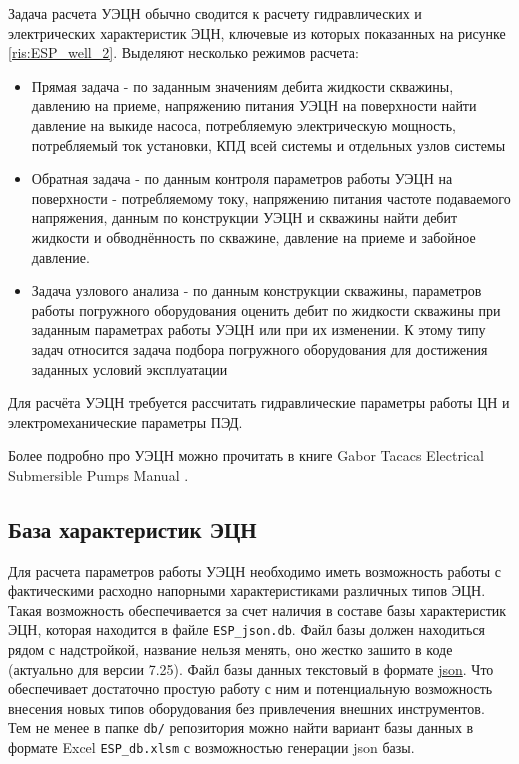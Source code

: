Задача расчета УЭЦН обычно сводится к расчету гидравлических и электрических характеристик ЭЦН, ключевые из которых показанных на рисунке \ref{ris:ESP_well_2}. Выделяют несколько режимов расчета:
\begin{itemize}
	\item Прямая задача - по заданным значениям дебита жидкости скважины,  давлению на приеме, напряжению питания УЭЦН на поверхности найти давление на выкиде насоса, потребляемую электрическую мощность, потребляемый ток установки, КПД всей системы и отдельных узлов системы
	\item Обратная задача - по данным контроля параметров работы УЭЦН на поверхности - потребляемому току, напряжению питания частоте подаваемого напряжения, данным по конструкции УЭЦН и скважины найти дебит жидкости и обводнённость по скважине, давление на приеме и забойное давление.
	\item Задача узлового анализа - по данным конструкции скважины, параметров работы погружного оборудования оценить дебит по жидкости скважины при заданным параметрах работы УЭЦН или при их изменении. К этому типу задач относится задача подбора погружного оборудования для достижения заданных условий эксплуатации 
	
\end{itemize}

Для расчёта УЭЦН требуется рассчитать гидравлические параметры работы ЦН и электромеханические параметры ПЭД.

Более подробно про УЭЦН можно прочитать в книге Gabor Tacacs Electrical Submersible Pumps Manual \cite{Gabor_ESP}.

\subsection{База характеристик ЭЦН}
Для расчета параметров работы УЭЦН необходимо иметь возможность работы с фактическими расходно напорными характеристиками различных типов ЭЦН. Такая возможность обеспечивается за счет наличия в составе \unf{} базы характеристик ЭЦН, которая находится в файле \texttt{ESP_json.db}. Файл базы должен находиться рядом с надстройкой, название нельзя менять, оно жестко зашито в коде (актуально для версии 7.25).
Файл базы данных текстовый в формате \href{https://ru.wikipedia.org/wiki/JSON}{json}. Что обеспечивает достаточно простую работу с ним и потенциальную возможность внесения новых типов оборудования без привлечения внешних инструментов. Тем не менее в папке \texttt{db/} репозитория можно найти вариант базы данных в формате Excel \texttt{ESP_db.xlsm} с возможностью генерации json базы.    

